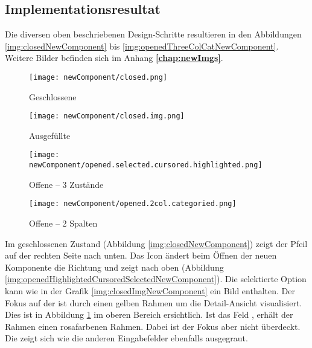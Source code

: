 \subsection{Implementationsresultat}
\label{sec:designImplementation}

Die diversen oben beschriebenen Design-Schritte resultieren in den Abbildungen \ref{img:closedNewComponent} bis \ref{img:openedThreeColCatNewComponent}. 
Weitere Bilder befinden sich im Anhang \textbf{\ref{chap:newImgs}}. 

\begin{figure}[!htb]
    \centering
    \begin{minipage}[b]{0.3\textwidth}
        \centering
        \begin{minipage}[t]{\textwidth}
            \centering
            \texttt{[image: newComponent/closed.png]}
            \caption{\centering Geschlossene }
            \label{img:closedNewComponent}
        \end{minipage}
        \vspace{0.6cm}\newline
        \begin{minipage}[b]{\textwidth}
            \centering
            \texttt{[image: newComponent/closed.img.png]}
            \caption{\centering Ausgefüllte }
            \label{img:closedImgNewComponent}
        \end{minipage}
        \newline
    \end{minipage}
    \hfill
    \begin{minipage}[b]{0.35\textwidth}
        \centering
        \texttt{[image: newComponent/opened.selected.cursored.highlighted.png]}
        \caption{\centering Offene  – 3 Zustände}
        \label{img:openedHighlightedCursoredSelectedNewComponent}
    \end{minipage}
    \hfill
    \begin{minipage}[b]{0.25\textwidth}
        \centering
        \texttt{[image: newComponent/opened.2col.categoried.png]}
        \caption{\centering Offene  – 2 Spalten}
        \label{img:openedTwoColCatNewComponent}
    \end{minipage}
\end{figure}

Im geschlossenen Zustand (Abbildung \ref{img:closedNewComponent}) zeigt der Pfeil auf der rechten Seite nach unten. 
Das Icon ändert beim Öffnen der neuen Komponente die Richtung und zeigt nach oben (Abbildung \ref{img:openedHighlightedCursoredSelectedNewComponent}). 
Die selektierte Option kann wie in der Grafik \ref{img:closedImgNewComponent} ein Bild enthalten. 
Der Fokus auf der  ist durch einen gelben Rahmen um die Detail-Ansicht visualisiert. 
Dies ist in Abbildung \ref{img:openedTwoColCatNewComponent} im oberen Bereich ersichtlich. 
Ist das Feld , erhält der Rahmen einen rosafarbenen Rahmen. 
Dabei ist der Fokus aber nicht überdeckt. 
Die   zeigt sich wie die anderen Eingabefelder ebenfalls ausgegraut. 

